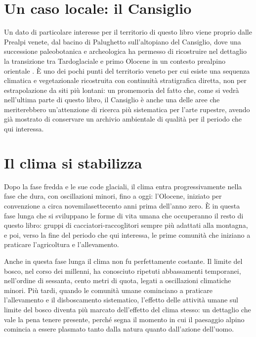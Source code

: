 \section{Un caso locale: il Cansiglio}

Un dato di particolare interesse per il territorio di questo libro viene proprio dalle Prealpi venete, dal bacino di Palughetto sull'altopiano del Cansiglio, dove una successione paleobotanica e archeologica ha permesso di ricostruire nel dettaglio la transizione tra Tardoglaciale e primo Olocene in un contesto prealpino orientale \citep{avigliano2000}. È uno dei pochi punti del territorio veneto per cui esiste una sequenza climatica e vegetazionale ricostruita con continuità stratigrafica diretta, non per estrapolazione da siti più lontani: un promemoria del fatto che, come si vedrà nell'ultima parte di questo libro, il Cansiglio è anche una delle aree che meriterebbero un'attenzione di ricerca più sistematica per l'arte rupestre, avendo già mostrato di conservare un archivio ambientale di qualità per il periodo che qui interessa.

\section{Il clima si stabilizza}

Dopo la fase fredda e le sue code glaciali, il clima entra progressivamente nella fase che dura, con oscillazioni minori, fino a oggi: l'Olocene, iniziato per convenzione a circa novemilasettecento anni prima dell'anno zero. È in questa fase lunga che si sviluppano le forme di vita umana che occuperanno il resto di questo libro: gruppi di cacciatori-raccoglitori sempre più adattati alla montagna, e poi, verso la fine del periodo che qui interessa, le prime comunità che iniziano a praticare l'agricoltura e l'allevamento.

Anche in questa fase lunga il clima non fu perfettamente costante. Il limite del bosco, nel corso dei millenni, ha conosciuto ripetuti abbassamenti temporanei, nell'ordine di sessanta, cento metri di quota, legati a oscillazioni climatiche minori. Più tardi, quando le comunità umane cominciano a praticare l'allevamento e il disboscamento sistematico, l'effetto delle attività umane sul limite del bosco diventa più marcato dell'effetto del clima stesso: un dettaglio che vale la pena tenere presente, perché segna il momento in cui il paesaggio alpino comincia a essere plasmato tanto dalla natura quanto dall'azione dell'uomo.

